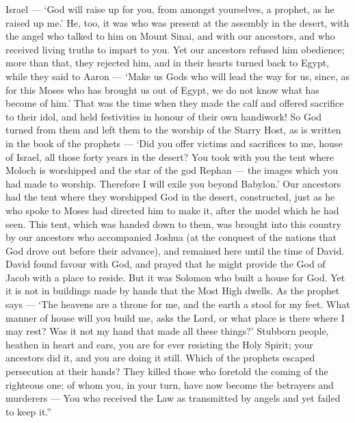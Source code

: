 Israel --- `God will raise up for you, from amongst yourselves, a
prophet, as he raised up me.'  He, too, it was who was
present at the assembly in the desert, with the angel who talked to him
on Mount Sinai, and with our ancestors, and who received living truths
to impart to you.  Yet our ancestors refused him obedience;
more than that, they rejected him, and in their hearts turned back to
Egypt,  while they said to Aaron --- `Make us Gods who will
lead the way for us, since, as for this Moses who has brought us out of
Egypt, we do not know what has become of him.'  That was
the time when they made the calf and offered sacrifice to their idol,
and held festivities in honour of their own handiwork!  So
God turned from them and left them to the worship of the Starry Host, as
is written in the book of the prophets --- `Did you offer victims and
sacrifices to me, house of Israel, all those forty years in the desert?
 You took with you the tent where Moloch is worshipped and
the star of the god Rephan --- the images which you had made to worship.
Therefore I will exile you beyond Babylon.'  Our ancestors
had the tent where they worshipped God in the desert, constructed, just
as he who spoke to Moses had directed him to make it, after the model
which he had seen.  This tent, which was handed down to
them, was brought into this country by our ancestors who accompanied
Joshua (at the conquest of the nations that God drove out before their
advance), and remained here until the time of David.  David
found favour with God, and prayed that he might provide the God of Jacob
with a place to reside.  But it was Solomon who built a
house for God.  Yet it is not in buildings made by hands
that the Most High dwells. As the prophet says ---  `The
heavens are a throne for me, and the earth a stool for my feet. What
manner of house will you build me, asks the Lord, or what place is there
where I may rest?  Was it not my hand that made all these
things?'  Stubborn people, heathen in heart and ears, you
are for ever resisting the Holy Spirit; your ancestors did it, and you
are doing it still.  Which of the prophets escaped
persecution at their hands? They killed those who foretold the coming of
the righteous one; of whom you, in your turn, have now become the
betrayers and murderers ---  You who received the Law as
transmitted by angels and yet failed to keep it.''

